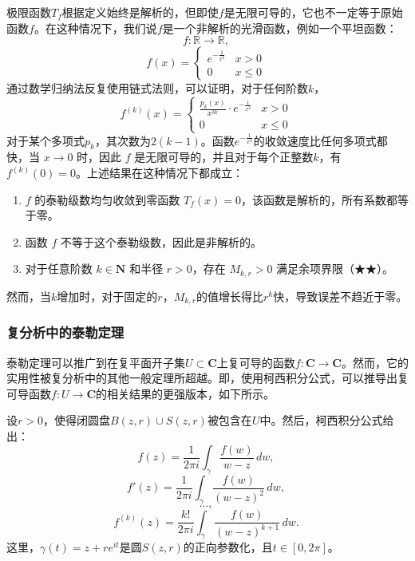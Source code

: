 极限函数\( T_f \)根据定义始终是解析的，但即使\( f \)是无限可导的，它也不一定等于原始函数\( f \)。在这种情况下，我们说\( f \)是一个非解析的光滑函数，例如一个平坦函数：
\[
f : \mathbb{R} \to \mathbb{R},~
\]
\[
f(x) = 
\begin{cases} 
e^{-\frac{1}{x^2}} & x > 0 \\
0 & x \leq 0 
\end{cases}~
\]
通过数学归纳法反复使用链式法则，可以证明，对于任何阶数\( k \)，
\[
f^{(k)}(x) = 
\begin{cases} 
\frac{p_k(x)}{x^{3k}} \cdot e^{-\frac{1}{x^2}} & x > 0 \\
0 & x \leq 0 
\end{cases}~
\]
对于某个多项式\( p_k \)，其次数为\( 2(k - 1) \)。函数\( e^{-\frac{1}{x^2}} \)的收敛速度比任何多项式都快，当 \( x \to 0 \) 时，因此 \( f \) 是无限可导的，并且对于每个正整数\( k \)，有\( f^{(k)}(0) = 0 \)。上述结果在这种情况下都成立：
\begin{enumerate}
\item \( f \) 的泰勒级数均匀收敛到零函数 \( T_f(x) = 0 \)，该函数是解析的，所有系数都等于零。
\item 函数 \( f \) 不等于这个泰勒级数，因此是非解析的。
\item 对于任意阶数 \( k \in \mathbf{N} \) 和半径 \( r > 0 \)，存在 \( M_{k,r} > 0 \) 满足余项界限（★★）。
\end{enumerate}
然而，当\( k \)增加时，对于固定的\( r \)，\( M_{k,r} \)的值增长得比\( r^k \)快，导致误差不趋近于零。
\subsubsection{复分析中的泰勒定理}  
泰勒定理可以推广到在复平面开子集\( U \subset \mathbf{C}\)上复可导的函数\( f : \mathbf{C}\to \mathbf{C} \)。然而，它的实用性被复分析中的其他一般定理所超越。即，使用柯西积分公式，可以推导出复可导函数\( f : U \to \mathbf{C}\)的相关结果的更强版本，如下所示。

设\( r > 0 \)，使得闭圆盘\( B(z, r) \cup S(z, r) \)被包含在\( U \)中。然后，柯西积分公式给出：
\[
f(z) = \frac{1}{2\pi i} \int_{\gamma} \frac{f(w)}{w - z} \, dw,~
\]
\[
f'(z) = \frac{1}{2\pi i} \int_{\gamma} \frac{f(w)}{(w - z)^2} \, dw,~
\]
\[
\ldots,~
\]
\[
f^{(k)}(z) = \frac{k!}{2\pi i} \int_{\gamma} \frac{f(w)}{(w - z)^{k+1}} \, dw.~
\]
这里，\( \gamma(t) = z + re^{it} \)是圆\( S(z, r) \)的正向参数化，且\( t \in [0, 2\pi] \)。

